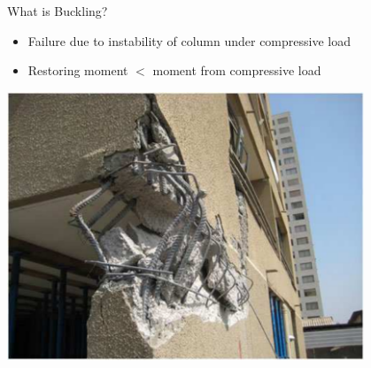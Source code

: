 \documentclass[10pt, svgnames]{beamer}
\begin{document}
\begin{frame}[label={sec:orga2aceec}]{What is Buckling?}
\begin{itemize}
\item Failure due to instability of column under compressive load
\item Restoring moment \(<\) moment from compressive load
\end{itemize}

\begin{center}
\includegraphics[width=0.8\textwidth]{pictures/buckled-column.pdf}
\end{center}
\end{frame}
\end{document}
